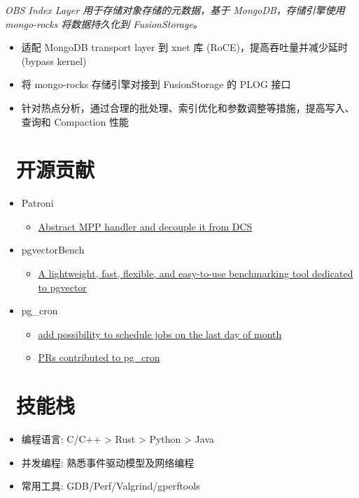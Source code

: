 \documentclass{resume}
\begin{document}
\textit{OBS Index Layer 用于存储对象存储的元数据，基于 MongoDB，存储引擎使用 mongo-rocks 将数据持久化到 FusionStorage。}
\begin{onehalfspacing}
\begin{itemize}
  \item 适配 MongoDB transport layer 到 xnet 库 (RoCE)，提高吞吐量并减少延时 (bypass kernel)
  \item 将 mongo-rocks 存储引擎对接到 FusionStorage 的 PLOG 接口
  \item 针对热点分析，通过合理的批处理、索引优化和参数调整等措施，提高写入、查询和 Compaction 性能
\end{itemize}
\end{onehalfspacing}

\section{\faCodeFork\ 开源贡献}
\begin{onehalfspacing}
  \begin{itemize}
    \item Patroni
      \begin{itemize}
        \item \href{https://github.com/zalando/patroni/pull/2960}{Abstract MPP handler and decouple it from DCS}
      \end{itemize}
    \item pgvectorBench
      \begin{itemize}
        \item \href{https://github.com/zhjwpku/pgvectorBench}{A lightweight, fast, flexible, and easy-to-use benchmarking tool dedicated to pgvector}
      \end{itemize}
    \item pg\_cron
      \begin{itemize}
        \item \href{https://github.com/citusdata/pg_cron/pull/273}{add possibility to schedule jobs on the last day of month}
        \item \href{https://github.com/citusdata/pg_cron/pulls?q=is%3Apr+author%3A%40me+}{PRs contributed to pg\_cron}
      \end{itemize}
  \end{itemize}
  \end{onehalfspacing}

\section{\faWrench\ 技能栈}
\begin{itemize}[parsep=0.5ex]
  \item 编程语言:  C/C++ > Rust > Python > Java
  \item 并发编程: 熟悉事件驱动模型及网络编程
  \item 常用工具: GDB/Perf/Valgrind/gperftools
\end{itemize}
\end{document}
